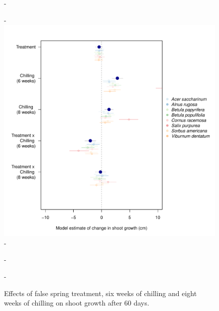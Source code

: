 \documentclass{article}\usepackage[]{graphicx}\usepackage[]{color}
\begin{document}
{\begin{figure} [H]
  -\begin{center}
  -\includegraphics[width=18cm]{..//analyses/figures/htdiff_brms.pdf} 
  -\caption{Effects of false spring treatment, six weeks of chilling and eight weeks of chilling on shoot growth after 60 days. }\label{fig:muheight}
  -\end{center}
  -\end{figure}}
\end{document}
